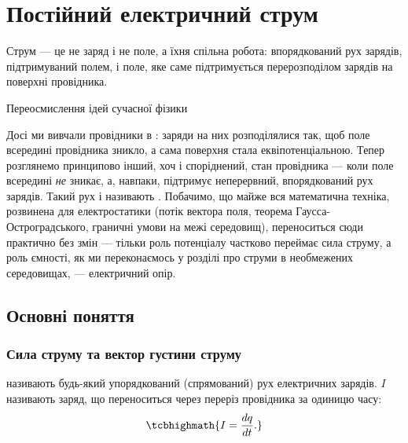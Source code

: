 
\chapter{Постійний електричний струм}\label{\currfilebase}\hypertarget{SteadyCurrent}{}
\graphicspath{{\currfilebase/Pictures}}
\epigraph{\Alexander Струм --- це не заряд і не поле, а їхня спільна робота: впорядкований рух зарядів, підтримуваний полем, і поле, яке саме
	підтримується перерозподілом зарядів на поверхні провідника.
}{Переосмислення ідей сучасної фізики}


Досі ми вивчали провідники в : заряди на них розподілялися так, щоб поле всередині провідника зникло, а сама поверхня стала еквіпотенціальною. Тепер розглянемо принципово інший, хоч і споріднений, стан провідника --- коли поле всередині \emph{не} зникає, а, навпаки, підтримує неперервний, впорядкований рух зарядів. Такий рух і називають . Побачимо, що майже вся математична техніка, розвинена для електростатики (потік вектора поля, теорема Гаусса-Остроградського, граничні умови на межі середовищ), переноситься сюди практично без змін --- тільки роль потенціалу частково переймає сила струму, а роль ємності, як ми переконаємось у розділі про струми в необмежених середовищах, --- електричний опір.

\section{Основні поняття}\hypertarget{current-basic-concepts}{}

\subsection*{Сила струму та вектор густини струму}

 називають будь-який упорядкований (спрямований) рух електричних зарядів.  $I$ називають заряд, що
переноситься через переріз провідника за одиницю часу:
\begin{equation}\label{eq:CurrentDef}
	\tcbhighmath{
		I = \frac{dq}{dt}.
	}
\end{equation}

